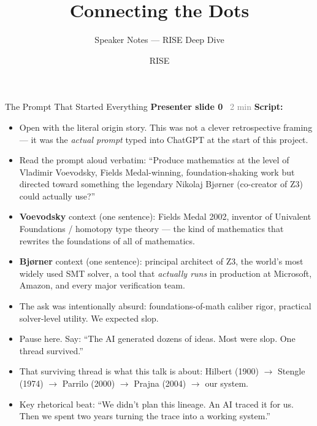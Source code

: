 \documentclass[aspectratio=169]{beamer}
\title{Connecting the Dots}
\subtitle{Speaker Notes — RISE Deep Dive}
\author{}
\date{RISE}
\newcommand{\syncline}[2]{\textbf{#1} \hfill \textcolor{gray}{#2}}
\begin{document}
\begin{frame}
\titlepage
\end{frame}


\begin{frame}{The Prompt That Started Everything}
\syncline{Presenter slide 0}{~2 min}
\textbf{Script:}
\begin{itemize}
  \item Open with the literal origin story. This was not a clever retrospective framing --- it was the \emph{actual prompt} typed into ChatGPT at the start of this project.
  \item Read the prompt aloud verbatim: ``Produce mathematics at the level of Vladimir Voevodsky, Fields Medal-winning, foundation-shaking work but directed toward something the legendary Nikolaj Bj\o rner (co-creator of Z3) could actually use?''
  \item \textbf{Voevodsky} context (one sentence): Fields Medal 2002, inventor of Univalent Foundations / homotopy type theory --- the kind of mathematics that rewrites the foundations of all of mathematics.
  \item \textbf{Bj\o rner} context (one sentence): principal architect of Z3, the world's most widely used SMT solver, a tool that \emph{actually runs} in production at Microsoft, Amazon, and every major verification team.
  \item The ask was intentionally absurd: foundations-of-math caliber rigor, practical solver-level utility. We expected slop.
  \item Pause here. Say: ``The AI generated dozens of ideas. Most were slop. One thread survived.''
  \item That surviving thread is what this talk is about: Hilbert (1900) $\to$ Stengle (1974) $\to$ Parrilo (2000) $\to$ Prajna (2004) $\to$ our system.
  \item Key rhetorical beat: ``We didn't plan this lineage. An AI traced it for us. Then we spent two years turning the trace into a working system.''
\end{itemize}
\end{frame}

\end{document}
